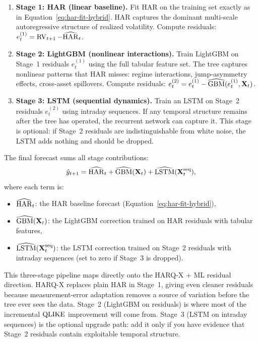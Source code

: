 \begin{enumerate}
  \item \textbf{Stage 1: HAR (linear baseline).}  Fit HAR on the
        training set exactly as in
        Equation~\eqref{eq:har-fit-hybrid}.  HAR captures the dominant
        multi-scale autoregressive structure of realized volatility.
        Compute residuals: $e_t^{(1)} = \operatorname{RV}_{t+1} -
        \widehat{\operatorname{HAR}}_t$.
  \item \textbf{Stage 2: LightGBM (nonlinear interactions).}  Train
        LightGBM on Stage~1 residuals $e_t^{(1)}$ using the full
        tabular feature set.  The tree captures nonlinear patterns that
        HAR misses: regime interactions, jump-asymmetry effects,
        cross-asset spillovers.  Compute residuals:
        $e_t^{(2)} = e_t^{(1)} - \widehat{\text{GBM}}(e_t^{(1)},
        \mathbf{X}_t)$.
  \item \textbf{Stage 3: LSTM (sequential dynamics).}  Train an
        LSTM on Stage~2 residuals $e_t^{(2)}$ using intraday sequences.
        If any temporal structure remains after the tree has operated,
        the recurrent network can capture it.  This stage is optional:
        if Stage~2 residuals are indistinguishable from white noise, the
        LSTM adds nothing and should be dropped.
\end{enumerate}

The final forecast sums all stage contributions:
\begin{equation}\label{eq:resid-stack-3}
  \hat{y}_{t+1} = \widehat{\operatorname{HAR}}_t
    + \widehat{\text{GBM}}(\mathbf{X}_t)
    + \widehat{\text{LSTM}}(\mathbf{X}_t^{\text{seq}}),
\end{equation}
where each term is:
\begin{itemize}
  \item $\widehat{\operatorname{HAR}}_t$: the HAR baseline forecast
        (Equation~\eqref{eq:har-fit-hybrid}),
  \item $\widehat{\text{GBM}}(\mathbf{X}_t)$: the LightGBM correction
        trained on HAR residuals with tabular features,
  \item $\widehat{\text{LSTM}}(\mathbf{X}_t^{\text{seq}})$: the LSTM
        correction trained on Stage~2 residuals with intraday
        sequences (set to zero if Stage~3 is dropped).
\end{itemize}

\begin{projectconnection}
This three-stage pipeline maps directly onto the HARQ-X + ML residual
direction.  HARQ-X replaces plain HAR in Stage~1, giving even cleaner
residuals because measurement-error adaptation removes a source of
variation before the tree ever sees the data.  Stage~2 (LightGBM on
residuals) is where most of the incremental $\operatorname{QLIKE}$ improvement will
come from.  Stage~3 (LSTM on intraday sequences) is the optional
upgrade path: add it only if you have evidence that Stage~2 residuals
contain exploitable temporal structure.
\end{projectconnection}

